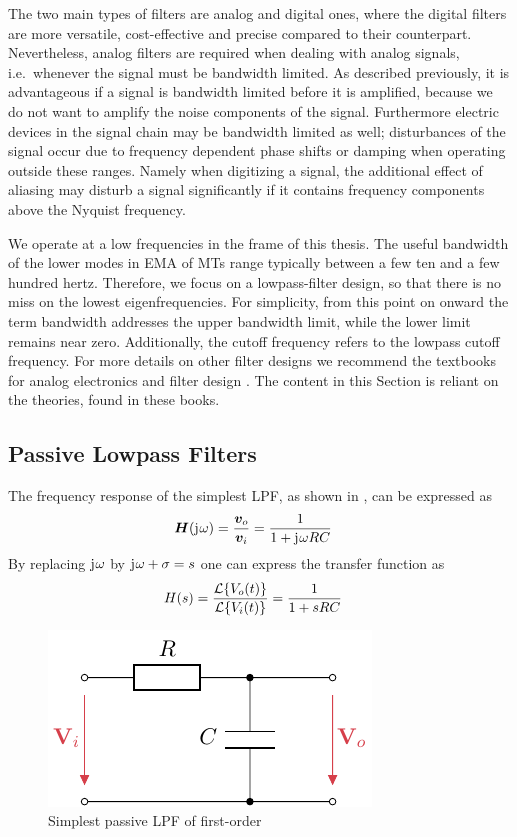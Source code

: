The two main types of filters are analog and digital ones, where the digital filters are more versatile, cost-effective and precise compared to their counterpart. Nevertheless, analog filters are required when dealing with analog signals, i.e.\ whenever the signal must be bandwidth limited. As described previously, it is advantageous if a signal is bandwidth limited before it is amplified, because we do not want to amplify the noise components of the signal. Furthermore electric devices in the signal chain may be bandwidth limited as well; disturbances of the signal occur due to frequency dependent phase shifts or damping when operating outside these ranges. Namely when digitizing a signal, the additional effect of aliasing may disturb a signal significantly if it contains frequency components above the Nyquist frequency.

We operate at a low frequencies in the frame of this thesis. The useful bandwidth of the lower modes in \ac{EMA} of \ac{MT}s range typically between a few ten and a few hundred hertz. Therefore, we focus on a lowpass-filter design, so that there is no miss on the lowest eigenfrequencies. For simplicity, from this point on onward the term bandwidth addresses the upper bandwidth limit, while the lower limit remains near zero. Additionally, the cutoff frequency refers to the lowpass cutoff frequency. For more details on other filter designs we recommend the textbooks for analog electronics and filter design \cite{Tietze2008EC, Stiny2019AeB, williams2014analog}. The content in this Section is reliant on the theories, found in these books.

\subsection{Passive Lowpass Filters}
The frequency response of the simplest \ac{LPF}, as shown in , can be expressed as
\begin{align}
  \bm{H}(\mathrm{j}\mkern1mu\omega) &= \frac{\bm{v}_o}{\bm{v}_i} = \frac{1}{1+\mathrm{j}\mkern1mu\omega RC}
\end{align}
By replacing $\mathrm{j}\mkern1mu\omega$ by $\mathrm{j}\mkern1mu\omega+\sigma = s$ one can express the transfer function as
\begin{align}
  H(s) &= \frac{\mathcal{L}\{V_o(t)\}}{\mathcal{L}\{V_i(t)\}} = \frac{1}{1 + sRC}
\end{align}

\begin{figure}[htb!]
  \centering
  \includegraphics[scale=1]{figures/electronics/lowpass/lp_passive_1ord/lp_passive_1ord}
  \caption[Passive first-order \ac{LPF}]{Simplest passive \ac{LPF} of first-order%
    \label{fig:lp_passive_1ord}}
\end{figure}

